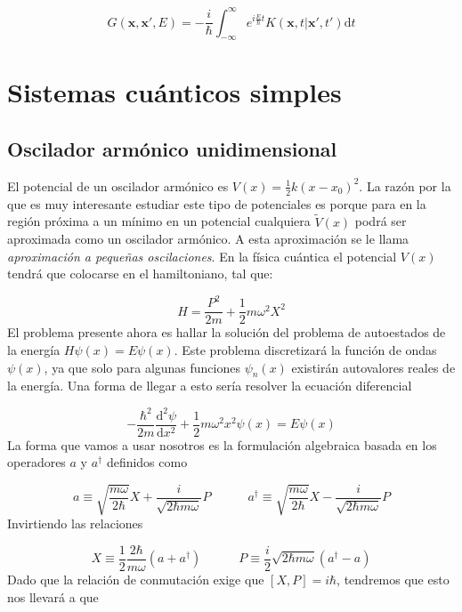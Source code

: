 \documentclass[12pt,a4paper]{book}
\numberwithin{equation}{chapter}
\numberwithin{figure}{chapter}
\newcommand{\tquad}{\quad \quad \quad}
\newcommand{\parentesis}[1]{\left( #1  \right)}
\newcommand{\D}{\mathrm{d}}
\newcommand{\derivadas}[2]{\frac{\D #1}{\D #2}}
\newcommand{\intinf}{\int_{-\infty}^{\infty}}
\newcommand{\xn}{\mathbf{x}}
\begin{document}
\begin{equation}
G(\xn,\xn',E) = - \frac{i}{\hbar} \intinf e^{i \frac{E}{\hbar} t} K(\xn,t|\xn',t') \D t
\end{equation}

\chapter{Sistemas cuánticos simples}


\section{Oscilador armónico unidimensional}

El potencial de un oscilador armónico es $V(x)=\frac{1}{2} k (x-x_0)^2$. La razón por la que es muy interesante estudiar este tipo de potenciales es porque para en la región próxima a un mínimo en un potencial cualquiera $\tilde{V}(x)$ podrá ser aproximada como un oscilador armónico. A esta aproximación se le llama \textit{aproximación a pequeñas oscilaciones}. En la física cuántica el potencial $V(x)$ tendrá que colocarse en el hamiltoniano, tal que:

\begin{equation}
H = \frac{P^2}{2m} + \frac{1}{2} m \omega^2 X^2
\end{equation}
El problema presente ahora es hallar la solución del problema de autoestados de la energía $H\psi(x)=E\psi(x)$. Este problema discretizará la función de ondas $\psi(x)$, ya que solo para algunas funciones $\psi_n(x)$ existirán autovalores reales de la energía. Una forma de llegar a esto sería resolver la ecuación diferencial 

\begin{equation}
-\frac{\hbar^2}{2m} \derivadas{^2 \psi}{x^2} + \frac{1}{2} m \omega^2 x^2 \psi(x) = E \psi(x)
\end{equation}
La forma que vamos a usar nosotros es la formulación algebraica basada en los operadores $a$ y $a^\dagger$ definidos como

\begin{equation}
a \equiv \sqrt{\frac{m \omega}{2 \hbar}} X + \frac{i}{\sqrt{2 \hbar m \omega}} P \tquad 
a^\dagger \equiv \sqrt{\frac{m \omega}{2 \hbar}} X - \frac{i}{\sqrt{2 \hbar m \omega}} P 
\end{equation}
Invirtiendo las relaciones

\begin{equation}
X \equiv \frac{1}{2} \frac{2 \hbar}{m \omega} \parentesis{a+a^\dagger}  \tquad P \equiv  \frac{i}{2} \sqrt{2 \hbar m \omega} \parentesis{a^\dagger-a} 
\end{equation}
Dado que la relación de conmutación exige que $[X,P]=i \hbar$, tendremos que esto nos llevará a que
\end{document}
